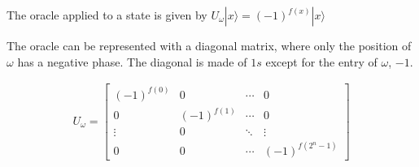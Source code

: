 \documentclass{article}
\begin{document}
The oracle applied to a state is given by \(U_\omega|x\rangle =(-1)^{f(x)}|x\rangle\)

The oracle can be represented with a diagonal matrix, where only the position of \(\omega\) has a negative phase.
The diagonal is made of \(1s\) except for the entry of \(\omega\), \(-1\).

\begin{align*}
    U_\omega=
    \begin{bmatrix}
        (-1)^{f(0)} & 0 & \cdots & 0 \\
        0 & (-1)^{f(1)} & \cdots & 0 \\
        \vdots & 0 & \ddots & \vdots \\
        0 & 0 & \cdots & (-1)^{f(2^n-1)}
    \end{bmatrix}
\end{align*}
\end{document}
